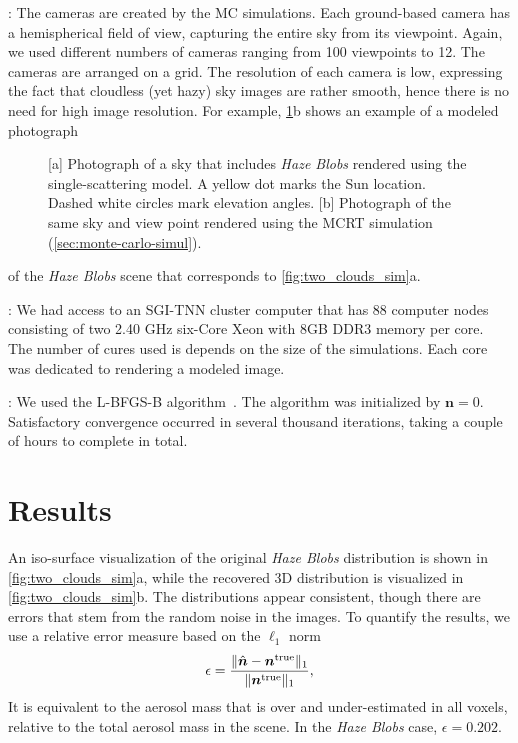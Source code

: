 \documentclass[10pt,letterpaper]{article}
\newcommand{\yoavcomment}[1]{}
\renewcommand{\yoavcomment}[1]{#1} %
\begin{document}
: The cameras are created by the MC simulations.
Each ground-based camera has a hemispherical field of view, capturing
the entire sky from its viewpoint. Again, we used different numbers of
cameras ranging from 100 viewpoints to 12. The cameras are arranged on
a grid.  The resolution of each camera is low, expressing the fact
that cloudless (yet hazy) sky images are rather smooth, hence there is
no need for high image resolution.  For example,
\cref{fig:simulation-results1}b shows an example of a modeled
photograph
\begin{figure}
  \centering
  \yoavcomment{\def\svgwidth{0.7\columnwidth}}
  \caption{\small [a] Photograph of a sky that includes {\em Haze
      Blobs} rendered using the single-scattering model.  A yellow dot
    marks the Sun location. Dashed white circles mark elevation
    angles.  [b] Photograph of the same sky and view point rendered
    using the MCRT simulation (\cref{sec:monte-carlo-simul}).}
  \label{fig:simulation-results1}
\end{figure}
of the {\em Haze Blobs} scene that corresponds to
\cref{fig:two_clouds_sim}a.

: We had access to an SGI-TNN cluster computer
that has 88 computer nodes consisting of two 2.40 GHz six-Core Xeon
with 8GB DDR3 memory per core. The number of cures used is depends
on the size of the simulations. Each core was dedicated to rendering a
modeled image.

: We used the L-BFGS-B
algorithm~\cite{BFGS}. The algorithm was initialized by ${\bm
  n}=0$. Satisfactory convergence occurred in several thousand
iterations, taking a couple of hours to complete in total.


\section{Results}
\label{sec:optimization-results}

An iso-surface visualization of the original {\em Haze Blobs}
distribution is shown in \cref{fig:two_clouds_sim}a, while the recovered
3D distribution is visualized in \cref{fig:two_clouds_sim}b. The
distributions appear consistent, though there are errors that stem
from the random noise in the images. To quantify the results, we use a
relative error measure based on the $\ell_1$ norm
\begin{equation}
  \label{eq:ndiff}
  \epsilon=\frac{\| \hat{\bm n}  - {\bm n}^{\rm true} \|_1}
  {\| {\bm n}^{\rm true} \|_1} ,
\end{equation}
It is equivalent to the aerosol mass that is over and under-estimated
in all voxels, relative to the total aerosol mass in the scene.  In
the {\em Haze Blobs} case, $\epsilon=0.202$.
\end{document}
